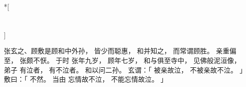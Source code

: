 
\switchcolumn[0]*[\section{}]

张玄之、顾敷是顾和中外孙，
皆少而聪惠，
和并知之，
而常谓顾胜。
亲重偏至，
张颇不恹。
于时
张年九岁，
顾年七岁，
和与俱至寺中，
见佛般泥洹像，
弟子
  有泣者，
有不泣者。
和以问二孙。
玄谓：「
      被亲故泣，
    不被亲故不泣。
」
敷曰：「
    不然。
    当由
        忘情故不泣，
    不能忘情故泣。
」

\switchcolumn


